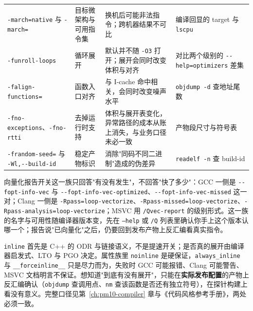 \documentclass[12pt,a4paper,fontset=fandol]{ctexbook}
\newcommand{\Tp}[1]{\texttt{#1}}
\newcommand{\Opt}[1]{\texttt{-\/-#1}}
\newcommand{\Bk}{\discretionary{}{}{}}
\newcommand{\Lang}[1]{\textsf{#1}}
\newcommand{\CPP}{\Lang{C++}}
\begin{document}
\begin{longtable}{>{\raggedright\arraybackslash}p{} >{\raggedright\arraybackslash}p{} >{\raggedright\arraybackslash}p{} >{\raggedright\arraybackslash}p{}}
\Tp{-{\Bk}march={\Bk}native} 与 \Tp{-march=} & 目标微架构与可用指令集 & 换机后可能非法指令；跨机器结果不可比 & 编译回显的 target 与 \Tp{lscpu} \\
\Tp{-{\Bk}funroll-{\Bk}loops} & 循环展开 & 默认并不随 \Tp{-O3} 打开；展开会同时改变体积与对齐 & 对比两个级别的 \Tp{-{\Bk}-{\Bk}help={\Bk}optimizers} 差集 \\
\Tp{-{\Bk}falign-{\Bk}functions={\Bk}} & 函数入口对齐 & 与 I-cache 命中相关，会同时改变噪声水平 & \Tp{objdump -{\Bk}d} 查地址尾数 \\
\Tp{-{\Bk}fno-{\Bk}exceptions}、\Tp{-fno-rtti} & 去掉运行时支持 & 体积与展开表变化，异常路径的成本从账上消失，与业务口径未必一致 & 产物段尺寸与符号表 \\
\Tp{-{\Bk}frandom-{\Bk}seed={\Bk}} 与 \Tp{-{\Bk}Wl,-{\Bk}-{\Bk}build-{\Bk}id} & 稳定产物标识 & 消除"同码不同二进制"造成的伪差异 & \Tp{readelf -{\Bk}n} 查 build-id \\
\end{longtable}

向量化报告开关这一族只回答"有没有发生"，不回答"快了多少"：GCC 一侧是 \Opt{fopt-info-vec} 与 \Opt{fopt-info-vec-optimized}、\Opt{fopt-info-vec-missed} 这一对；Clang 一侧是 \Tp{-Rpass=loop-vectorize}、\Tp{-Rpass-missed=loop-vectorize}、\Tp{-Rpass-analysis=loop-vectorize}；MSVC 用 \Tp{/Qvec-report} 的级别形式。这一族的名字与可用性随编译器版本变，先在 \Tp{--help} 或 \Tp{/Q} 列表里确认你手上这个版本认哪一个；报告说"已向量化"之后，仍要回到发布产物上反汇编看真实指令。

\begin{note}[title={内联相关：属性不是提速开关}]
\Tp{inline} 首先是 \CPP{} 的 ODR 与链接语义，不是提速开关；是否真的展开由编译器启发式、LTO 与 PGO 决定。属性族里 \Tp{noinline} 是硬保证，\Tp{always\_inline} 与 \Tp{\_\_forceinline\_\_} 只是尽力而为，失败时 GCC 可能报错、Clang 可能警告、MSVC 文档明言不保证。想知道"到底有没有展开"，只能在\textbf{实际发布配置}的产物上反汇编确认（\Tp{objdump} 查调用点、\Tp{nm} 查该函数是否还有独立符号），在探针构建上看没有意义。完整口径见第~\ref{ch:pm10-compiler} 章与《代码风格参考手册》，两处必须一致。
\end{note}
\end{document}
